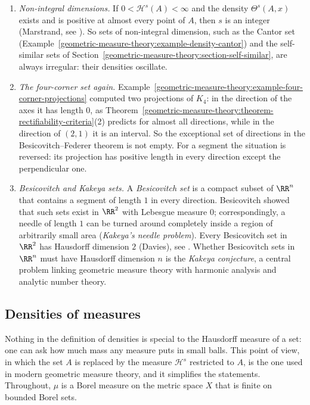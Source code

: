 \begin{remark}\label{geometric-measure-theory:remark-densities}
\begin{enumerate}
\item \emph{Non-integral dimensions.} If $0 < \mathcal{H}^s(A) < \infty$ and the density $\Theta^s(A, x)$ exists and is positive at almost every point of $A$, then $s$ is an integer (Marstrand, see
\cite{mattila-1995}). So sets of non-integral dimension, such as the Cantor set (Example~\ref{geometric-measure-theory:example-density-cantor}) and the self-similar sets of
Section~\ref{geometric-measure-theory:section-self-similar}, are always irregular: their densities oscillate.
\item \emph{The four-corner set again.} Example~\ref{geometric-measure-theory:example-four-corner-projections} computed two projections of $K_4$: in the direction of the axes it has length $0$, as
Theorem~\ref{geometric-measure-theory:theorem-rectifiability-criteria}(2) predicts for almost all directions, while in the direction of $(2, 1)$ it is an interval. So the exceptional set of directions in the
Besicovitch--Federer theorem is not empty. For a segment the situation is reversed: its projection has positive length in every direction except the perpendicular one.
\item \emph{Besicovitch and Kakeya sets.} A \emph{Besicovitch set} is a compact subset of $\RR^n$ that contains a segment of length $1$ in every direction. Besicovitch showed that such sets exist in
$\RR^2$ with Lebesgue measure $0$; correspondingly, a needle of length $1$ can be turned around completely inside a region of arbitrarily small area (\emph{Kakeya's needle problem}). Every Besicovitch
set in $\RR^2$ has Hausdorff dimension $2$ (Davies), see \cite{falconer-gofs}. Whether Besicovitch sets in $\RR^n$ must have Hausdorff dimension $n$ is the \emph{Kakeya conjecture}, a central problem
linking geometric measure theory with harmonic analysis and analytic number theory.
\end{enumerate}
\end{remark}

\subsection{Densities of measures}\label{geometric-measure-theory:subsection-measure-densities}

Nothing in the definition of densities is special to the Hausdorff measure of a set: one can ask how much mass any measure puts in small balls. This point of view, in which the set $A$ is replaced
by the measure $\mathcal{H}^s$ restricted to $A$, is the one used in modern geometric measure theory, and it simplifies the statements. Throughout, $\mu$ is a Borel measure on the metric space $X$ that is
finite on bounded Borel sets.


